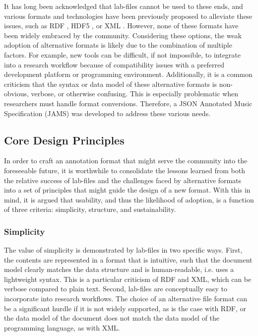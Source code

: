 \noindent It has long been acknowledged that lab-files cannot be used to these ends, and various formats and technologies have been previously proposed to alleviate these issues, such as RDF \cite{Cannam2006Sonic}, HDF5 \cite{Bertin2011Million}, or XML \cite{McKay2005Ace}.
However, none of these formats have been widely embraced by the community.
Considering these options, the weak adoption of alternative formats is likely due to the combination of multiple factors.
For example, new tools can be difficult, if not impossible, to integrate into a research workflow because of compatibility issues with a preferred development platform or programming environment.
Additionally, it is a common criticism that the syntax or data model of these alternative formats is non-obvious, verbose, or otherwise confusing.
This is especially problematic when researchers must handle format conversions.
Therefore, a JSON Annotated Music Specification (JAMS) was developed to address these various needs.


\subsection{Core Design Principles}
\label{subsec:design}

In order to craft an annotation format that might serve the community into the foreseeable future, it is worthwhile to consolidate the lessons learned from both the relative success of lab-files and the challenges faced by alternative formats into a set of principles that might guide the design of a new format.
With this in mind, it is argued that usability, and thus the likelihood of adoption, is a function of three criteria:
simplicity, structure, and sustainability.

\subsubsection{Simplicity}
\label{subsubsec:simplicity}
The value of simplicity is demonstrated by lab-files in two specific ways.
First, the contents are represented in a format that is intuitive, such that the document model clearly matches the data structure and is human-readable, i.e. uses a lightweight syntax.
This is a particular criticism of RDF and XML, which can be verbose compared to plain text.
Second, lab-files are conceptually easy to incorporate into research workflows.
The choice of an alternative file format can be a significant hurdle if it is not widely supported, as is the case with RDF, or the data model of the document does not match the data model of the programming language, as with XML.

